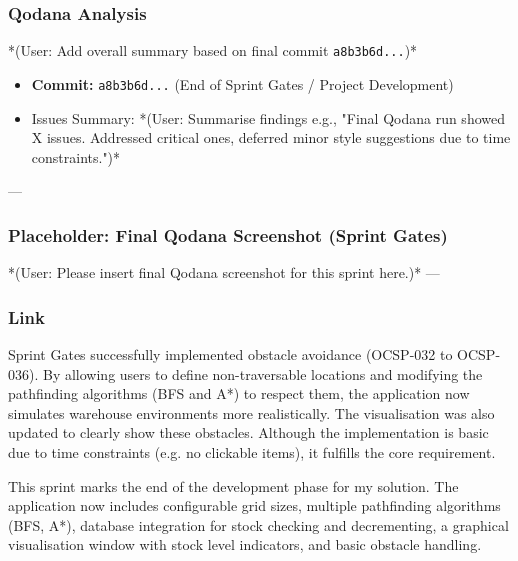 \subsubsection{Qodana Analysis}
*(User: Add overall summary based on final commit \verb|a8b3b6d...|)*
\begin{itemize}
	\item \textbf{Commit:} \verb|a8b3b6d...| (End of Sprint Gates / Project Development)
	\item Issues Summary: *(User: Summarise findings e.g., "Final Qodana run showed X issues. Addressed critical ones, deferred minor style suggestions due to time constraints.")*
\end{itemize}

--- %
\subsubsection*{Placeholder: Final Qodana Screenshot (Sprint Gates)}
*(User: Please insert final Qodana screenshot for this sprint here.)*
---

\subsubsection{Link}
Sprint Gates successfully implemented obstacle avoidance (OCSP-032 to OCSP-036). By allowing users to define non-traversable locations and modifying the pathfinding algorithms (BFS and A*) to respect them, the application now simulates warehouse environments more realistically. The visualisation was also updated to clearly show these obstacles. Although the implementation is basic due to time constraints (e.g. no clickable items), it fulfills the core requirement.

This sprint marks the end of the development phase for my solution. The application now includes configurable grid sizes, multiple pathfinding algorithms (BFS, A*), database integration for stock checking and decrementing, a graphical visualisation window with stock level indicators, and basic obstacle handling.

